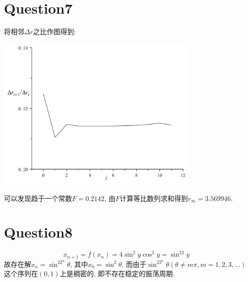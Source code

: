 \documentclass[UTF8]{ctexart}
\begin{document}
    \section{Question7}
        \indent 将相邻$\Delta r$之比作图得到:
        \begin{center}
            \includegraphics[width=10cm]{delta_r.pdf}
        \end{center}
        可以发现趋于一个常数$F=0.2142$, 由$F$计算等比数列求和得到$r_\infty=3.569946$.
    \section{Question8}
        \begin{equation}
            x_{n+1}=f(x_n)=4\sin^2y\cos^2y=\sin^22y
        \end{equation}
        故存在解$x_n=\sin^22^n\theta$, 其中$x_0=\sin^2\theta$. 而由于$\sin^22^n\theta(\theta\neq m\pi, m=1,2,3,...)$
        这个序列在$(0,1)$上是稠密的, 即不存在稳定的振荡周期.
\end{document}
